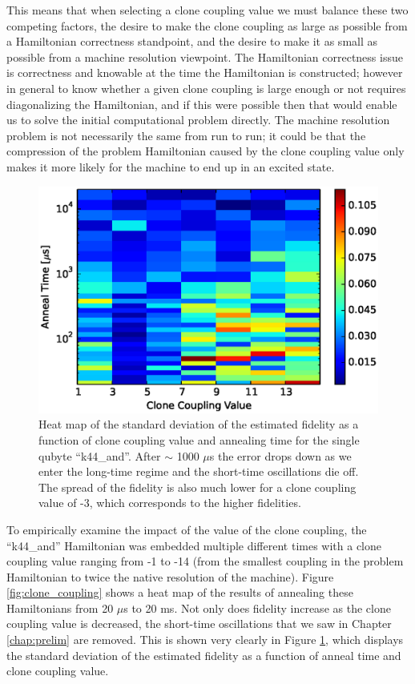 This means that when selecting a clone coupling value we must balance these two competing factors, the desire to make the clone coupling as large as possible from a Hamiltonian correctness standpoint, and the desire to make it as small as possible from a machine resolution viewpoint.  The Hamiltonian correctness issue is correctness and knowable at the time the Hamiltonian is constructed; however in general to know whether a given clone coupling is large enough or not requires diagonalizing the Hamiltonian, and if this were possible then that would enable us to solve the initial computational problem directly.
The machine resolution problem is not necessarily the same from run to run; it could be that the compression of the problem Hamiltonian caused by the clone coupling value only makes it more likely for the machine to end up in an excited state.

\begin{figure}
	\includegraphics{img/t_c.eps}
	\caption[Fidelity Std.]{Heat map of the standard deviation of the estimated fidelity as a function of clone coupling value and annealing time for the single qubyte ``k44\_and''.  After $\sim$ 1000 $\mu$s the error drops down as we enter the long-time regime and the short-time oscillations die off.  The spread of the fidelity is also much lower for a clone coupling value of -3, which corresponds to the higher fidelities.}
	\label{fig:std_time}
\end{figure}

To empirically examine the impact of the value of the clone coupling, the ``k44\_and'' Hamiltonian was embedded multiple different times with a clone coupling value ranging from -1 to -14 (from the smallest coupling in the problem Hamiltonian to twice the native resolution of the machine).  Figure \ref{fig:clone_coupling} shows a heat map of the results of annealing these Hamiltonians from 20 $\mu$s to 20 ms.  Not only does fidelity increase as the clone coupling value is decreased, the short-time oscillations that we saw in Chapter \ref{chap:prelim} are removed.  This is shown very clearly in Figure \ref{fig:std_time}, which displays the standard deviation of the estimated fidelity as a function of anneal time and clone coupling value.

